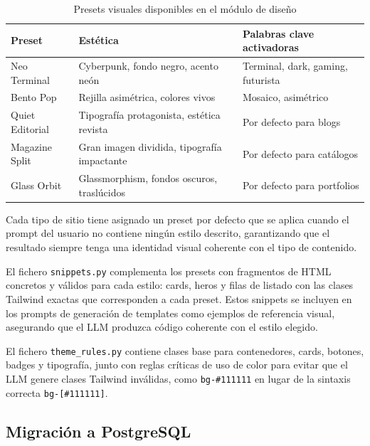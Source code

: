 \begin{table}[H]
    \centering
    \begin{tabular}{|l|l|p{5cm}|}
        \hline
        \textbf{Preset} & \textbf{Estética} & \textbf{Palabras clave activadoras} \\
        \hline
        Neo Terminal & Cyberpunk, fondo negro, acento neón & Terminal, dark, gaming, futurista \\
        \hline
        Bento Pop & Rejilla asimétrica, colores vivos & Mosaico, asimétrico \\
        \hline
        Quiet Editorial & Tipografía protagonista, estética revista & Por defecto para blogs \\
        \hline
        Magazine Split & Gran imagen dividida, tipografía impactante & Por defecto para catálogos \\
        \hline
        Glass Orbit & Glassmorphism, fondos oscuros, traslúcidos & Por defecto para portfolios \\
        \hline
    \end{tabular}
    \caption{Presets visuales disponibles en el módulo de diseño}
    \label{tab:presets-visuales}
\end{table}

Cada tipo de sitio tiene asignado un preset por defecto que se aplica cuando el prompt del usuario no contiene ningún estilo descrito, garantizando que el resultado siempre tenga una identidad visual coherente con el tipo de contenido.

El fichero \texttt{snippets.py} complementa los presets con fragmentos de HTML concretos y válidos para cada estilo: cards, heros y filas de listado con las clases Tailwind exactas que corresponden a cada preset. Estos snippets se incluyen en los prompts de generación de templates como ejemplos de referencia visual, asegurando que el LLM produzca código coherente con el estilo elegido.

El fichero \texttt{theme\_rules.py} contiene clases base para contenedores, cards, botones, badges y tipografía, junto con reglas críticas de uso de color para evitar que el LLM genere clases Tailwind inválidas, como \texttt{bg-\#111111} en lugar de la sintaxis correcta \texttt{bg-[\#111111]}.

\subsection{Migración a PostgreSQL}
\label{subsec:migracion-postgresql}

